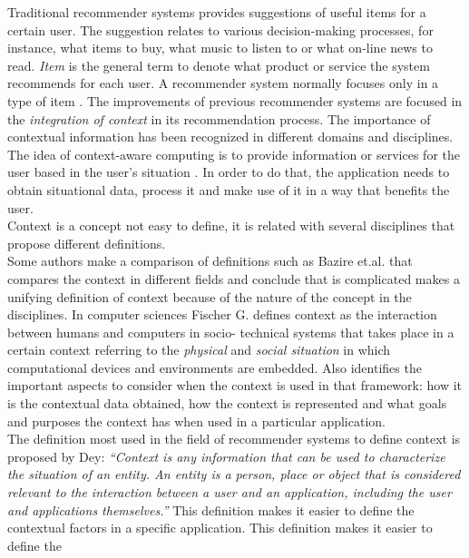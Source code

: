 Traditional recommender systems provides suggestions of useful
items for a certain user. The suggestion relates to various 
decision-making processes, for instance, what items to buy, what music to
listen to or what on-line news to read. \textit{Item} is the general
term to denote what product or service the system recommends for each
user. A recommender system normally focuses only in a type of item
\cite{resnick1997recommender}.
The improvements of previous recommender systems are focused in the
\textit{integration of context} in its recommendation process. 
The importance of contextual information has been recognized 
in different domains and disciplines.  %
The idea of context-aware computing is to provide
information or services for the user based in the user’s situation
\cite{dey2001understanding}. In order to do that, the application 
needs to obtain situational data, process it and make use of it 
in a way that benefits the user. \\ 
Context is a concept not easy to define, it is related with 
several disciplines that propose different definitions.\\  %
Some authors make a comparison of definitions such as Bazire et.al.
\cite{bazire2005understanding} that compares the context in different
fields and conclude that is complicated makes a unifying definition of
context because of the nature of the concept in the disciplines.
In computer sciences Fischer G.\cite{fischer2012context} defines
context as the interaction between humans and computers in socio-
technical systems that takes place in a certain context referring to
the \textit{physical} and \textit{social situation} in which 
computational devices and environments are embedded.
Also identifies the important aspects to consider when the context is
used in that framework: how it is the contextual data obtained, how
the context is represented and what goals and purposes the
context has when used in a particular application. \\
The definition most used in the field of recommender systems to
define context is proposed by Dey\cite{dey2001understanding}:
\textit{``Context is any information that can be used to characterize
the situation of an entity. An entity is a person, place or object
that is considered relevant to the interaction between a user and  an
application, including the user and applications themselves.''}  This
definition makes it easier to define the contextual factors in a
specific application. This definition makes it easier to define the
